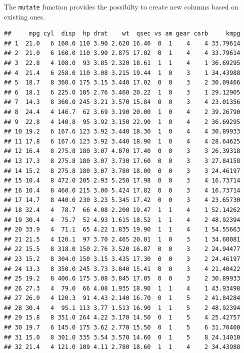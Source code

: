 \documentclass[]{report}
\newenvironment{Shaded}{\begin{snugshade}}{\end{snugshade}}
\newcommand{\KeywordTok}[1]{\textcolor[rgb]{0.13,0.29,0.53}{\textbf{#1}}}
\newcommand{\DataTypeTok}[1]{\textcolor[rgb]{0.13,0.29,0.53}{#1}}
\newcommand{\FloatTok}[1]{\textcolor[rgb]{0.00,0.00,0.81}{#1}}
\newcommand{\CommentTok}[1]{\textcolor[rgb]{0.56,0.35,0.01}{\textit{#1}}}
\newcommand{\OperatorTok}[1]{\textcolor[rgb]{0.81,0.36,0.00}{\textbf{#1}}}
\newcommand{\NormalTok}[1]{#1}
\begin{document}
The \texttt{mutate} function provides the possibilty to create new
columns based on existing ones.

\begin{Shaded}
\end{Shaded}

\begin{verbatim}
##     mpg cyl  disp  hp drat    wt  qsec vs am gear carb     kmpg
## 1  21.0   6 160.0 110 3.90 2.620 16.46  0  1    4    4 33.79614
## 2  21.0   6 160.0 110 3.90 2.875 17.02  0  1    4    4 33.79614
## 3  22.8   4 108.0  93 3.85 2.320 18.61  1  1    4    1 36.69295
## 4  21.4   6 258.0 110 3.08 3.215 19.44  1  0    3    1 34.43988
## 5  18.7   8 360.0 175 3.15 3.440 17.02  0  0    3    2 30.09466
## 6  18.1   6 225.0 105 2.76 3.460 20.22  1  0    3    1 29.12905
## 7  14.3   8 360.0 245 3.21 3.570 15.84  0  0    3    4 23.01356
## 8  24.4   4 146.7  62 3.69 3.190 20.00  1  0    4    2 39.26790
## 9  22.8   4 140.8  95 3.92 3.150 22.90  1  0    4    2 36.69295
## 10 19.2   6 167.6 123 3.92 3.440 18.30  1  0    4    4 30.89933
## 11 17.8   6 167.6 123 3.92 3.440 18.90  1  0    4    4 28.64625
## 12 16.4   8 275.8 180 3.07 4.070 17.40  0  0    3    3 26.39318
## 13 17.3   8 275.8 180 3.07 3.730 17.60  0  0    3    3 27.84158
## 14 15.2   8 275.8 180 3.07 3.780 18.00  0  0    3    3 24.46197
## 15 10.4   8 472.0 205 2.93 5.250 17.98  0  0    3    4 16.73714
## 16 10.4   8 460.0 215 3.00 5.424 17.82  0  0    3    4 16.73714
## 17 14.7   8 440.0 230 3.23 5.345 17.42  0  0    3    4 23.65730
## 18 32.4   4  78.7  66 4.08 2.200 19.47  1  1    4    1 52.14262
## 19 30.4   4  75.7  52 4.93 1.615 18.52  1  1    4    2 48.92394
## 20 33.9   4  71.1  65 4.22 1.835 19.90  1  1    4    1 54.55663
## 21 21.5   4 120.1  97 3.70 2.465 20.01  1  0    3    1 34.60081
## 22 15.5   8 318.0 150 2.76 3.520 16.87  0  0    3    2 24.94477
## 23 15.2   8 304.0 150 3.15 3.435 17.30  0  0    3    2 24.46197
## 24 13.3   8 350.0 245 3.73 3.840 15.41  0  0    3    4 21.40422
## 25 19.2   8 400.0 175 3.08 3.845 17.05  0  0    3    2 30.89933
## 26 27.3   4  79.0  66 4.08 1.935 18.90  1  1    4    1 43.93498
## 27 26.0   4 120.3  91 4.43 2.140 16.70  0  1    5    2 41.84284
## 28 30.4   4  95.1 113 3.77 1.513 16.90  1  1    5    2 48.92394
## 29 15.8   8 351.0 264 4.22 3.170 14.50  0  1    5    4 25.42757
## 30 19.7   6 145.0 175 3.62 2.770 15.50  0  1    5    6 31.70400
## 31 15.0   8 301.0 335 3.54 3.570 14.60  0  1    5    8 24.14010
## 32 21.4   4 121.0 109 4.11 2.780 18.60  1  1    4    2 34.43988
\end{verbatim}
\end{document}
